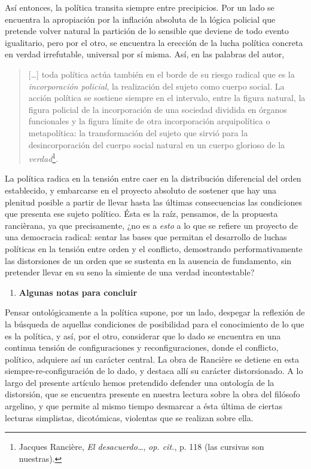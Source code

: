 \documentclass{book}
\begin{document}
Así entonces, la política transita siempre entre precipicios. Por un
lado se encuentra la apropiación por la inflación absoluta de la lógica
policial que pretende volver natural la partición de lo sensible que
deviene de todo evento igualitario, pero por el otro, se encuentra la
erección de la lucha política concreta en verdad irrefutable, universal
por sí misma. Así, en las palabras del autor,

\begin{quote}
{[}\ldots{]} toda política actúa también en el borde de su riesgo
radical que es la \emph{incorporación policial}, la realización del
sujeto como cuerpo social. La acción política se sostiene siempre en el
intervalo, entre la figura natural, la figura policial de la
incorporación de una sociedad dividida en órganos funcionales y la
figura límite de otra incorporación arquipolítica o metapolítica: la
transformación del sujeto que sirvió para la desincorporación del cuerpo
social natural en un cuerpo glorioso de la \emph{verdad}\footnote{Jacques
  Rancière, \emph{El desacuerdo\ldots{}}, \emph{op. cit.}, p. 118 (las
  cursivas son nuestras).}.
\end{quote}

La política radica en la tensión entre caer en la distribución
diferencial del orden establecido, y embarcarse en el proyecto absoluto
de sostener que hay una plenitud posible a partir de llevar hasta las
últimas consecuencias las condiciones que presenta ese sujeto político.
Ésta es la raíz, pensamos, de la propuesta rancièrana, ya que
precisamente, ¿no es a \emph{esto} a lo que se refiere un proyecto de
una democracia radical: sentar las bases que permitan el desarrollo de
luchas políticas en la tensión entre orden y el conflicto, demostrando
performativamente las distorsiones de un orden que se sustenta en la
ausencia de fundamento, sin pretender llevar en su seno la simiente de
una verdad incontestable?

\begin{enumerate}
\def\labelenumi{\arabic{enumi}.}
\setcounter{enumi}{6}
\item
  \textbf{Algunas notas para concluir}
\end{enumerate}

Pensar ontológicamente a la política supone, por un lado, despegar la
reflexión de la búsqueda de aquellas condiciones de posibilidad para el
conocimiento de lo que es la política, y así, por el otro, considerar
que lo dado se encuentra en una continua tensión de configuraciones y
reconfiguraciones, donde el conflicto, político, adquiere así un
carácter central. La obra de Rancière se detiene en esta
siempre-re-configuración de lo dado, y destaca allí su carácter
distorsionado. A lo largo del presente artículo hemos pretendido
defender una ontología de la distorsión, que se encuentra presente en
nuestra lectura sobre la obra del filósofo argelino, y que permite al
mismo tiempo desmarcar a ésta última de ciertas lecturas simplistas,
dicotómicas, violentas que se realizan sobre ella.
\end{document}
